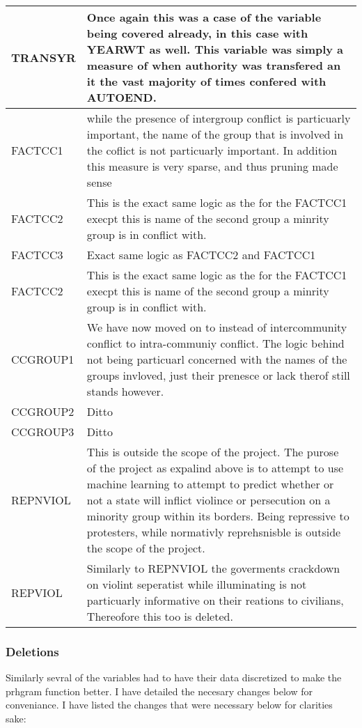 \documentclass[12pt]{article}
\begin{document}
\begin{center}
\begin{longtable}{p{3cm}p{10cm}}
\hline 
TRANSYR & Once again this was a case of the variable being covered already, in this case with YEARWT as well. This variable was simply a measure of when authority was transfered an it the vast majority of times confered with AUTOEND.\\
\hline 
FACTCC1 & while the presence of intergroup conflict is particuarly important, the name of the group that is involved in the coflict is not particuarly important. In addition this measure is very sparse, and thus pruning made sense\\
\hline 
FACTCC2 & This is the exact same logic as the for the FACTCC1 execpt this is name of the second group a minrity group is in conflict with. \\
\hline
FACTCC3 & Exact same logic as FACTCC2 and FACTCC1\\
\hline
FACTCC2 & This is the exact same logic as the for the FACTCC1 execpt this is name of the second group a minrity group is in conflict with. \\
\hline
CCGROUP1 & We have now moved on to instead of intercommunity conflict to intra-communiy conflict. The logic behind not being particuarl concerned with the names of the groups invloved, just their prenesce or lack therof still stands however.\\
\hline
CCGROUP2 & Ditto \\
\hline
CCGROUP3 & Ditto \\
\hline
REPNVIOL & This is outside the scope of the project. The purose of the project as expalind above is to attempt to use machine learning to attempt to predict whether or not a state will inflict violince or persecution on a minority group within its borders. Being repressive to protesters, while normativly reprehsnisble is outside the scope of the project.\\
\hline
REPVIOL & Similarly to REPNVIOL the goverments crackdown on violint seperatist while illuminating is not particuarly informative on their reations to civilians, Thereofore this too is deleted. 
\end{longtable}
\end{center}

\subsubsection{Deletions}
Similarly sevral of the variables had to have their data discretized to make the prhgram function better. I have detailed the necesary changes below for conveniance. I have listed the changes that were necessary below for clarities sake:
\end{document}
